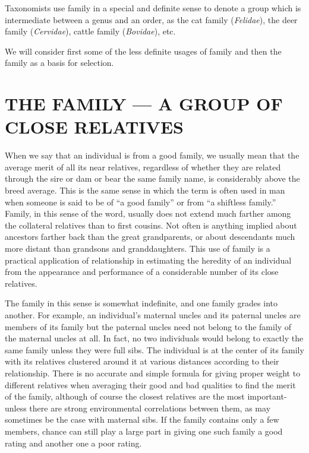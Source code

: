 Taxonomists use family in a special and definite sense to denote a
group which is intermediate between a genus and an order, as the cat
family (\textit{Felidae}), the deer family (\textit{Cervidae}), cattle
family (\textit{Bovidae}), etc.

We will consider first some of the less definite usages of family and
then the family as a basis for selection.

\section*{THE FAMILY --- A GROUP OF CLOSE RELATIVES}

When we say that an individual is from a good family, we usually
mean that the average merit of all its near relatives, regardless of whether
they are related through the sire or dam or bear the same family
name, is considerably above the breed average. This is the same sense in
which the term is often used in man when someone is said to be of ``a
good family'' or from ``a shiftless family.'' Family, in this sense of the
word, usually does not extend much farther among the collateral relatives
than to first cousins. Not often is anything implied about ancestors
farther back than the great grandparents, or about descendants much
more distant than grandsons and granddaughters. This use of family is
a practical application of relationship in estimating the heredity of an
individual from the appearance and performance of a considerable
number of its close relatives.

The family in this sense is somewhat indefinite, and one family
grades into another. For example, an individual's maternal uncles and
its paternal uncles are members of its family but the paternal uncles
need not belong to the family of the maternal uncles at all. In fact, no
two individuals would belong to exactly the same family unless they
were full sibs. The individual is at the center of its family with its relatives
clustered around it at various distances according to their relationship.
There is no accurate and simple formula for giving proper weight
to different relatives when averaging their good and bad qualities to
find the merit of the family, although of course the closest relatives are
the most important-unless there are strong environmental correlations
between them, as may sometimes be the case with maternal sibs. If the
family contains only a few members, chance can still play a large part
in giving one such family a good rating and another one a poor rating.

